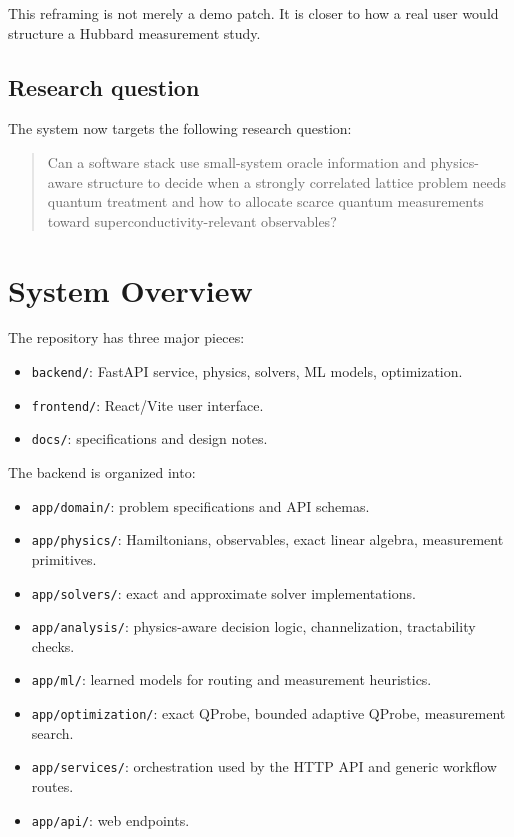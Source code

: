 \documentclass[11pt]{article}
\begin{document}
This reframing is not merely a demo patch. It is closer to how a real user would structure a Hubbard measurement study.

\subsection{Research question}

The system now targets the following research question:

\begin{quote}
Can a software stack use small-system oracle information and physics-aware structure to decide when a strongly correlated lattice problem needs quantum treatment and how to allocate scarce quantum measurements toward superconductivity-relevant observables?
\end{quote}

\section{System Overview}

The repository has three major pieces:

\begin{itemize}
\item \verb|backend/|: FastAPI service, physics, solvers, ML models, optimization.
\item \verb|frontend/|: React/Vite user interface.
\item \verb|docs/|: specifications and design notes.
\end{itemize}

The backend is organized into:

\begin{itemize}
\item \verb|app/domain/|: problem specifications and API schemas.
\item \verb|app/physics/|: Hamiltonians, observables, exact linear algebra, measurement primitives.
\item \verb|app/solvers/|: exact and approximate solver implementations.
\item \verb|app/analysis/|: physics-aware decision logic, channelization, tractability checks.
\item \verb|app/ml/|: learned models for routing and measurement heuristics.
\item \verb|app/optimization/|: exact QProbe, bounded adaptive QProbe, measurement search.
\item \verb|app/services/|: orchestration used by the HTTP API and generic workflow routes.
\item \verb|app/api/|: web endpoints.
\end{itemize}
\end{document}

